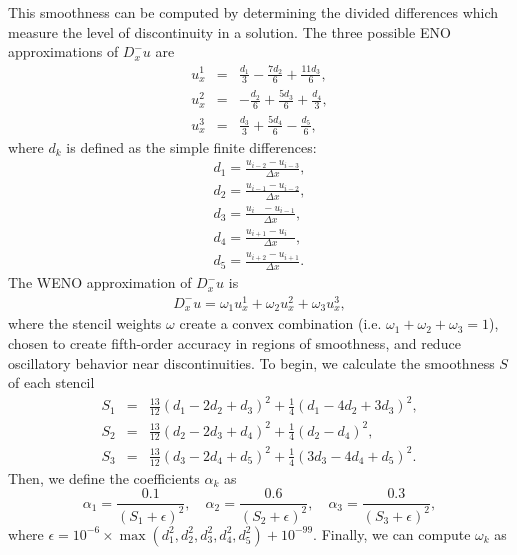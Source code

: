 \documentclass[oneside,12pt,final]{/Applications/TeX/packages/ucthesis-CA2012}
\begin{document}
\begin{mainmatter}
This smoothness can be computed by determining the divided differences which measure the level of discontinuity in a solution. The three possible ENO approximations of $D_x^- u$ are
\begin{eqnarray*}
u_{x}^{1}&=&  \frac{d_{1}}{3}-\frac{7d_{2}}{6}+\frac{11d_{3}}{6}, \\
u_{x}^{2}&=& -\frac{d_{2}}{6}+\frac{5d_{3}}{6}+\frac{d_{4}}{3}, \\
u_{x}^{3}&=&  \frac{d_{3}}{3}+\frac{5d_{4}}{6}-\frac{d_{5}}{6},
\end{eqnarray*}
where $d_{k}$ is defined as the simple finite differences:
\begin{eqnarray*}
d_{1}=\frac{u_{i-2}-u_{i-3}}{\Delta x}, \\
d_{2}=\frac{u_{i-1}-u_{i-2}}{\Delta x}, \\
d_{3}=\frac{u_{i\>\>\>\>\>}-u_{i-1}}{\Delta x}, \\
d_{4}=\frac{u_{i+1}-u_{i\>\>\>\>\>}}{\Delta x}, \\
d_{5}=\frac{u_{i+2}-u_{i+1}}{\Delta x}.
\end{eqnarray*}
The WENO approximation of $D_x^- u$ is
\begin{eqnarray}
D^{-}_{x}u=\omega_{1}u_{x}^{1}+\omega_{2}u_{x}^{2}+\omega_{3}u_{x}^{3}, \label{eqn:WENO}
\end{eqnarray}
where the stencil weights $\omega$ create a convex combination (i.e. $\omega_1 + \omega_2 + \omega_3 = 1$), chosen to create fifth-order accuracy in regions of smoothness, and reduce oscillatory behavior near discontinuities. To begin, we calculate the smoothness $S$ of each stencil
\begin{eqnarray*}
S_{1}&=&\frac{13}{12}(d_{1}-2d_{2}+d_{3})^{2}+\frac14(d_{1}-4d_{2}+3d_{3})^{2}, \\
S_{2}&=&\frac{13}{12}(d_{2}-2d_{3}+d_{4})^{2}+\frac14(d_{2}-d_{4})^{2}, \\
S_{3}&=&\frac{13}{12}(d_{3}-2d_{4}+d_{5})^{2}+\frac14(3d_{3}-4d_{4}+d_{5})^{2}.
\end{eqnarray*}
Then, we define the coefficients $\alpha_{k}$ as
\begin{equation*}
\alpha_{1}=\frac{0.1}{(S_{1}+\epsilon)^{2}}, \quad
\alpha_{2}=\frac{0.6}{(S_{2}+\epsilon)^{2}}, \quad
\alpha_{3}=\frac{0.3}{(S_{3}+\epsilon)^{2}},
\end{equation*}
where $\epsilon=10^{-6} \times \max(d_{1}^{2}, d_{2}^{2}, d_{3}^{2}, d_{4}^{2}, d_{5}^{2})+10^{-99}$. Finally, we can compute $\omega_k$ as
\begin{equation*}

\end{equation*}
\end{mainmatter}
\end{document}
